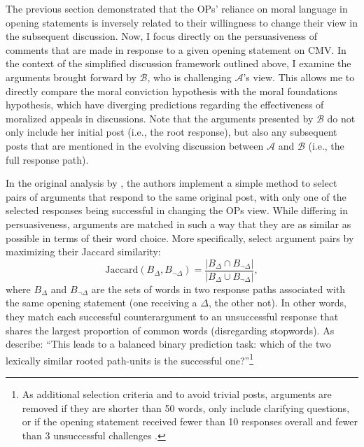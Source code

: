 
The previous section demonstrated that the OPs' reliance on moral language in opening statements is inversely related to their willingness to change their view in the subsequent discussion. Now, I focus directly on the persuasiveness of comments that are made in response to a given opening statement on CMV. In the context of the simplified discussion framework outlined above, I examine the arguments brought forward by $\mathcal{B}$, who is challenging $\mathcal{A}$'s view. This allows me to directly compare the moral conviction hypothesis with the moral foundations hypothesis, which have diverging predictions regarding the effectiveness of moralized appeals in discussions. Note that the arguments presented by $\mathcal{B}$ do not only include her initial post (i.e., the root response), but also any subsequent posts that are mentioned in the evolving discussion between $\mathcal{A}$ and $\mathcal{B}$ (i.e., the full response path).

In the original analysis by \citet{tan2016winning}, the authors implement a simple method to select pairs of arguments that respond to the same original post, with only one of the selected responses being successful in changing the OPs view. While differing in persuasiveness, arguments are matched in such a way that they are as similar as possible in terms of their word choice. More specifically, \citet{tan2016winning} select argument pairs by maximizing their Jaccard similarity:
\begin{equation}
\text{Jaccard}(B_\Delta,B_{\neg\Delta})=\dfrac{|B_\Delta\cap B_{\neg\Delta}|}{|B_\Delta\cup B_{\neg\Delta}|},
\end{equation}
where $B_\Delta$ and $B_{\neg\Delta}$ are the sets of words in two response paths associated with the same opening statement (one receiving a $\Delta$, the other not). In other words, they match each successful counterargument to an unsuccessful response that shares the largest proportion of common words (disregarding stopwords). As \citet[617]{tan2016winning} describe: ``This leads to a balanced binary prediction task: which of the two lexically similar rooted path-units is the successful one?''\footnote{As additional selection criteria and to avoid trivial posts, arguments are removed if they are shorter than 50 words, only include clarifying questions, or if the opening statement received fewer than 10 responses overall and fewer than 3 unsuccessful challenges \citep[see][617 for details]{tan2016winning}.}

